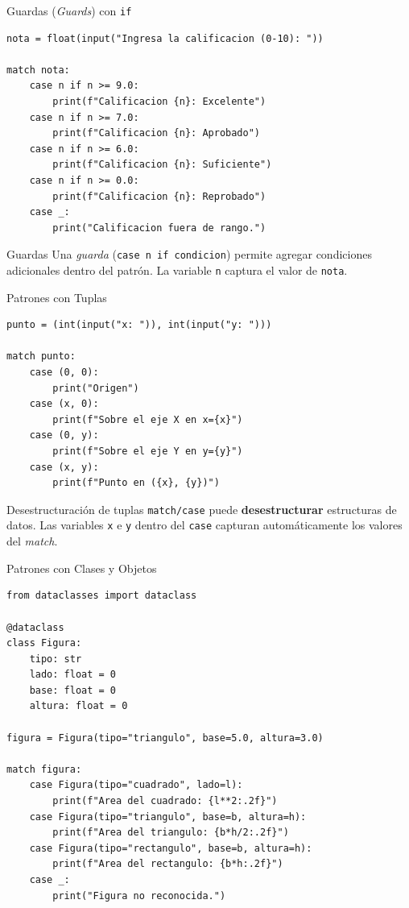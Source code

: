\documentclass[aspectratio=169,xcolor=dvipsnames]{beamer}
\begin{document}
\begin{frame}[fragile]{Guardas (\textit{Guards}) con \texttt{if}}
\begin{lstlisting}[style=PythonStyle]
nota = float(input("Ingresa la calificacion (0-10): "))

match nota:
    case n if n >= 9.0:
        print(f"Calificacion {n}: Excelente")
    case n if n >= 7.0:
        print(f"Calificacion {n}: Aprobado")
    case n if n >= 6.0:
        print(f"Calificacion {n}: Suficiente")
    case n if n >= 0.0:
        print(f"Calificacion {n}: Reprobado")
    case _:
        print("Calificacion fuera de rango.")
\end{lstlisting}

    \begin{exampleblock}{Guardas}
        Una \textit{guarda} (\texttt{case n if condicion}) permite agregar condiciones adicionales dentro del patrón. La variable \texttt{n} captura el valor de \texttt{nota}.
    \end{exampleblock}
\end{frame}

\begin{frame}[fragile]{Patrones con Tuplas}
\begin{lstlisting}[style=PythonStyle]
punto = (int(input("x: ")), int(input("y: ")))

match punto:
    case (0, 0):
        print("Origen")
    case (x, 0):
        print(f"Sobre el eje X en x={x}")
    case (0, y):
        print(f"Sobre el eje Y en y={y}")
    case (x, y):
        print(f"Punto en ({x}, {y})")
\end{lstlisting}

    \begin{block}{Desestructuración de tuplas}
        \texttt{match/case} puede \textbf{desestructurar} estructuras de datos. Las variables \texttt{x} e \texttt{y} dentro del \texttt{case} capturan automáticamente los valores del \textit{match}.
    \end{block}
\end{frame}

\begin{frame}[fragile]{Patrones con Clases y Objetos}
\begin{lstlisting}[style=PythonStyle]
from dataclasses import dataclass

@dataclass
class Figura:
    tipo: str
    lado: float = 0
    base: float = 0
    altura: float = 0

figura = Figura(tipo="triangulo", base=5.0, altura=3.0)

match figura:
    case Figura(tipo="cuadrado", lado=l):
        print(f"Area del cuadrado: {l**2:.2f}")
    case Figura(tipo="triangulo", base=b, altura=h):
        print(f"Area del triangulo: {b*h/2:.2f}")
    case Figura(tipo="rectangulo", base=b, altura=h):
        print(f"Area del rectangulo: {b*h:.2f}")
    case _:
        print("Figura no reconocida.")
\end{lstlisting}
\end{frame}
\end{document}
